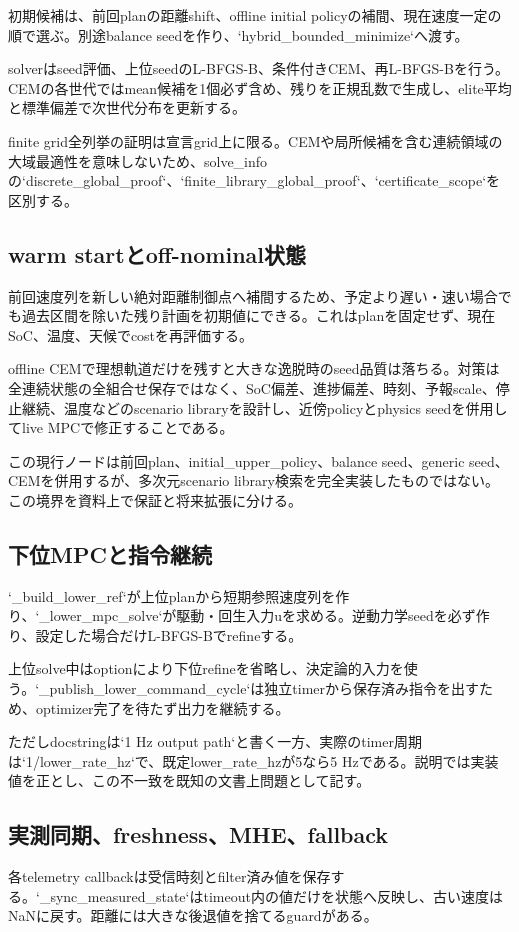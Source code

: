 \documentclass[a4paper,11pt]{article}
\begin{document}
初期候補は、前回planの距離shift、offline initial policyの補間、現在速度一定の順で選ぶ。別途balance seedを作り、`hybrid\_bounded\_minimize`へ渡す。


solverはseed評価、上位seedのL-BFGS-B、条件付きCEM、再L-BFGS-Bを行う。CEMの各世代ではmean候補を1個必ず含め、残りを正規乱数で生成し、elite平均と標準偏差で次世代分布を更新する。


finite grid全列挙の証明は宣言grid上に限る。CEMや局所候補を含む連続領域の大域最適性を意味しないため、solve\_infoの`discrete\_global\_proof`、`finite\_library\_global\_proof`、`certificate\_scope`を区別する。



\subsection{warm startとoff-nominal状態}
前回速度列を新しい絶対距離制御点へ補間するため、予定より遅い・速い場合でも過去区間を除いた残り計画を初期値にできる。これはplanを固定せず、現在SoC、温度、天候でcostを再評価する。


offline CEMで理想軌道だけを残すと大きな逸脱時のseed品質は落ちる。対策は全連続状態の全組合せ保存ではなく、SoC偏差、進捗偏差、時刻、予報scale、停止継続、温度などのscenario libraryを設計し、近傍policyとphysics seedを併用してlive MPCで修正することである。


この現行ノードは前回plan、initial\_upper\_policy、balance seed、generic seed、CEMを併用するが、多次元scenario library検索を完全実装したものではない。この境界を資料上で保証と将来拡張に分ける。



\subsection{下位MPCと指令継続}
`\_build\_lower\_ref`が上位planから短期参照速度列を作り、`\_lower\_mpc\_solve`が駆動・回生入力uを求める。逆動力学seedを必ず作り、設定した場合だけL-BFGS-Bでrefineする。


上位solve中はoptionにより下位refineを省略し、決定論的入力を使う。`\_publish\_lower\_command\_cycle`は独立timerから保存済み指令を出すため、optimizer完了を待たず出力を継続する。


ただしdocstringは`1 Hz output path`と書く一方、実際のtimer周期は`1/lower\_rate\_hz`で、既定lower\_rate\_hzが5なら5 Hzである。説明では実装値を正とし、この不一致を既知の文書上問題として記す。



\subsection{実測同期、freshness、MHE、fallback}
各telemetry callbackは受信時刻とfilter済み値を保存する。`\_sync\_measured\_state`はtimeout内の値だけを状態へ反映し、古い速度はNaNに戻す。距離には大きな後退値を捨てるguardがある。
\end{document}
